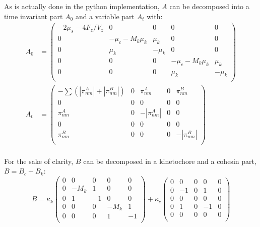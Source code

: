 \documentclass[a4paper,12pt]{article}
\begin{document}
\begin{itemize}
As is actually done in the python implementation, 
$A$  can be decomposed into a time invariant part $A_0$ and a
variable part $A_t$ with:\\
\begin{equation}
  \begin{aligned}
    A_0 &=%
    \begin{pmatrix}
      - 2 \mu_s - 4 F_z/V_z & 0&0&0&0\\
      0 &  -\mu_c - M_k \mu_k& \mu_k & 0&0\\
      0 & \mu_k & - \mu_k & 0&0\\
      0&0&0 & -\mu_c - M_k \mu_k & \mu_k\\
      0&0&0 & \mu_k & - \mu_k\\
    \end{pmatrix}\\
    A_t &=%
    \begin{pmatrix}
      - \sum (|\pi_{nm}^A| + |\pi_{nm}^B|)& 0 & \pi_{nm}^A &%
      0 &  \pi_{nm}^B\\
      0&0&0&0&0\\
      \pi_{nm}^A & 0 & - |\pi_{nm}^A| & 0&0\\
      0&0&0&0&0\\
      \pi_{nm}^B & 0&0&0 & - |\pi_{nm}^B| \\
    \end{pmatrix}\\
  \end{aligned}
\end{equation}

For the sake of clarity, $B$ can be decomposed in a kinetochore and a
cohesin part, $B = B_c + B_k$:
\begin{equation}
  B = \kappa_k%
  \begin{pmatrix}
    0 & 0&0&0&0\\
    0 &  - M_k  & 1 & 0&0 \\
    0 & 1 & -1 &  0&0\\
    0 &  0&0 & - M_k  & 1 \\
    0&0&0  & 1 & - 1\\
  \end{pmatrix}
  + \kappa_c%
  \begin{pmatrix}
    0 & 0&0&0&0\\
    0 & - 1 & 0 & 1  & 0 \\
    0&0&0&0&0\\
    0 & 1 & 0 & -1 & 0 \\
    0&0&0&0&0\\
  \end{pmatrix}
\end{equation}
\end{itemize}
\end{document}
